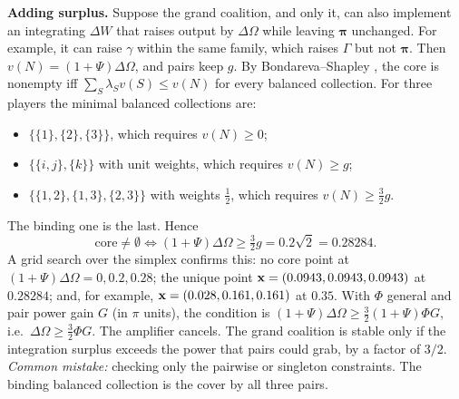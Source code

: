 \documentclass[../solutions_manual.tex]{subfiles}
\begin{document}
\textbf{Adding surplus.} Suppose the grand coalition, and only it, can also implement an integrating $\Delta W$ that raises output by $\Delta\Omega$ while leaving $\boldsymbol{\pi}$ unchanged. For example, it can raise $\gamma$ within the same family, which raises $\Gamma$ but not $\boldsymbol{\pi}$. Then $v(N) = (1+\Psi)\Delta\Omega$, and pairs keep $g$. By Bondareva--Shapley \citep{bondareva1963some,shapley1967balanced}, the core is nonempty iff $\sum_S\lambda_S v(S) \le v(N)$ for every balanced collection. For three players the minimal balanced collections are:
\begin{itemize}
\item $\{\{1\},\{2\},\{3\}\}$, which requires $v(N) \ge 0$;
\item $\{\{i,j\},\{k\}\}$ with unit weights, which requires $v(N) \ge g$;
\item $\{\{1,2\},\{1,3\},\{2,3\}\}$ with weights $\tfrac12$, which requires $v(N) \ge \tfrac32 g$.
\end{itemize}
The binding one is the last. Hence
\[
\text{core} \neq \emptyset \iff (1+\Psi)\Delta\Omega \ge \tfrac32 g = 0.2\sqrt2 = 0.28284 .
\]
A grid search over the simplex confirms this: no core point at $(1+\Psi)\Delta\Omega = 0, 0.2, 0.28$; the unique point $\mathbf{x} = (0.0943, 0.0943, 0.0943)$ at $0.28284$; and, for example, $\mathbf{x} = (0.028, 0.161, 0.161)$ at $0.35$. With $\Phi$ general and pair power gain $G$ (in $\pi$ units), the condition is $(1+\Psi)\Delta\Omega \ge \tfrac32(1+\Psi)\Phi G$, i.e.\ $\Delta\Omega \ge \tfrac32\Phi G$. The amplifier cancels. The grand coalition is stable only if the integration surplus exceeds the power that pairs could grab, by a factor of $3/2$. \textit{Common mistake:} checking only the pairwise or singleton constraints. The binding balanced collection is the cover by all three pairs.

\fussy
\end{document}
